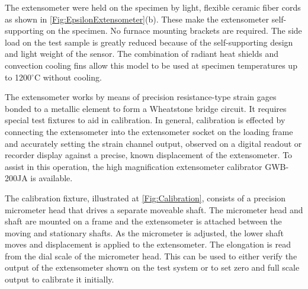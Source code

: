 The extensometer were held on the specimen by light, flexible ceramic fiber cords as shown in \ref{Fig:EpsilonExtensometer}(b).
These make the extensometer self-supporting on the specimen.
No furnace mounting brackets are required.
The side load on the test sample is greatly reduced because of the self-supporting design and light weight of the sensor.
The combination of radiant heat shields and convection cooling fins allow this model to be used at specimen temperatures up to 1200$^{\circ}$C without cooling.

The extensometer works by means of precision resistance-type strain gages bonded to a metallic element to form a Wheatstone bridge circuit.
It requires special test fixtures to aid in calibration.
In general, calibration is effected by connecting the extensometer into the extensometer socket on the loading frame and accurately setting the strain channel output, observed on a digital readout or recorder display against a precise, known displacement of the extensometer.
To assist in this operation, the high magnification extensometer calibrator GWB-200JA is available.

The calibration fixture, illustrated at \ref{Fig:Calibration}, consists of a precision micrometer head that drives a separate moveable shaft.
The micrometer head and shaft are mounted on a frame and the extensometer is attached between the moving and stationary shafts.
As the micrometer is adjusted, the lower shaft moves and displacement is applied to the extensometer.
The elongation is read from the dial scale of the micrometer head. This can be used to either verify the output of the extensometer shown on the test system or to set zero and full scale output to calibrate it initially.


